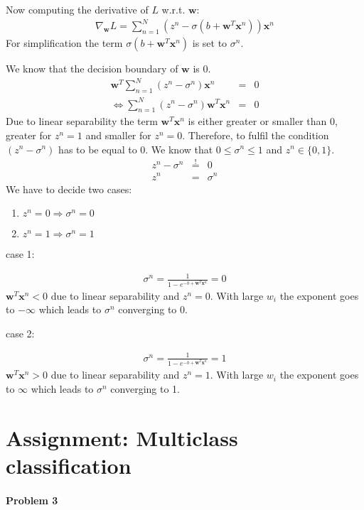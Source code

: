 \documentclass{article}
\renewcommand{\Vec}[1]{\ensuremath{\mathbf{#1}}}
\begin{document}
Now computing the derivative of $L$ w.r.t. $\Vec{w}$:
\begin{eqnarray}
\nabla_{\Vec{w}}L = \sum_{n=1}^N(z^n - \sigma(b+\Vec{w}^T\Vec{x}^n))\Vec{x}^n
\end{eqnarray}
For simplification the term $\sigma(b+\Vec{w}^T\Vec{x}^n)$ is set to $\sigma^n$.

We know that the decision boundary of $\Vec{w}$ is 0.
\begin{eqnarray}
\Vec{w}^T \sum_{n=1}^N (z^n-\sigma^n) \Vec{x}^n &=& 0\\
\Leftrightarrow \sum_{n=1}^N (z^n-\sigma^n) \Vec{w}^T \Vec{x}^n &=& 0
\end{eqnarray}
Due to linear separability the term $\Vec{w}^T \Vec{x}^n$ is either greater or smaller than 0, greater for $z^n = 1$ and smaller for $z^n=0$. Therefore, to fulfil the condition $(z^n-\sigma^n)$ has to be equal to 0. We know that $0 \leq \sigma^n \leq 1$ and $z^n \in \{0,1\}$.
\begin{eqnarray}
z^n-\sigma^n &\overset{!}{=}& 0\\
z^n &=& \sigma^n
\end{eqnarray}
We have to decide two cases:
\begin{enumerate}
\item $z^n = 0 \Rightarrow \sigma^n = 0$
\item $z^n = 1 \Rightarrow \sigma^n = 1$
\end{enumerate}

case 1:

\begin{eqnarray}
\sigma^n = \frac{1}{1-e^{-b+\Vec{w}^T\Vec{x}^n}} = 0
\end{eqnarray}
$\Vec{w}^T\Vec{x}^n < 0$ due to linear separability and $z^n = 0$. With large $w_i$ the exponent goes to $-\infty$ which leads to $\sigma^n$ converging to 0.

case 2:

\begin{eqnarray}
\sigma^n = \frac{1}{1-e^{-b+\Vec{w}^T\Vec{x}^n}} = 1
\end{eqnarray}
$\Vec{w}^T\Vec{x}^n > 0$ due to linear separability and $z^n = 1$. With large $w_i$ the exponent goes to $\infty$ which leads to $\sigma^n$ converging to 1.


\section{Assignment: Multiclass classification}
\paragraph*{Problem 3}
$\;$ 
\end{document}

